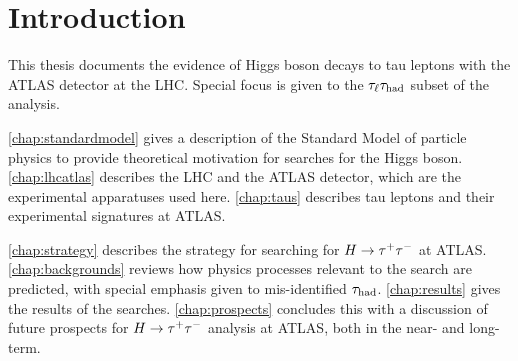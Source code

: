\chapter[Introduction][Introduction]{Introduction}
\label{chap:introduction}

This thesis documents the evidence of Higgs boson decays to tau leptons with the ATLAS detector at the LHC. Special focus is given to the $\tau_\ell\tau_\text{had}$ subset of the analysis.

\cref{chap:standardmodel} gives a description of the Standard Model of particle physics to provide theoretical motivation for searches for the Higgs boson. \cref{chap:lhcatlas} describes the LHC and the ATLAS detector, which are the experimental apparatuses used here. \cref{chap:taus} describes tau leptons and their experimental signatures at ATLAS.

\cref{chap:strategy} describes the strategy for searching for ${H\rightarrow \tau^{+}\tau^{-}}$ at ATLAS. \cref{chap:backgrounds} reviews how physics processes relevant to the search are predicted, with special emphasis given to mis-identified $\tau_\text{had}$. \cref{chap:results} gives the results of the searches. \cref{chap:prospects} concludes this with a discussion of future prospects for ${H\rightarrow \tau^{+}\tau^{-}}$ analysis at ATLAS, both in the near- and long-term.


